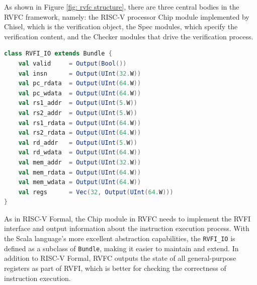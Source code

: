 \documentclass[conference]{IEEEtran}
\theoremstyle{definition}
\begin{document}
As shown in Figure \ref{fig: rvfc structure}, there are three central bodies in the RVFC framework, namely: the RISC-V processor Chip module implemented by Chisel, which is the verification object, the Spec modules, which specify the verification content, and the Checker modules that drive the verification process.

\begin{lstlisting}[language=scala, caption={RVFI Definition in RVFC}, label=rvfic]
class RVFI_IO extends Bundle {
    val valid     = Output(Bool())
    val insn      = Output(UInt(32.W))
    val pc_rdata  = Output(UInt(64.W))
    val pc_wdata  = Output(UInt(64.W))
    val rs1_addr  = Output(UInt(5.W))
    val rs2_addr  = Output(UInt(5.W))
    val rs1_rdata = Output(UInt(64.W))
    val rs2_rdata = Output(UInt(64.W))
    val rd_addr   = Output(UInt(5.W))
    val rd_wdata  = Output(UInt(64.W))
    val mem_addr  = Output(UInt(32.W))
    val mem_rdata = Output(UInt(64.W))
    val mem_wdata = Output(UInt(64.W))
    val regs      = Vec(32, Output(UInt(64.W)))
}
\end{lstlisting}

As in RISC-V Formal, the Chip module in RVFC needs to implement the RVFI interface and output information about the instruction execution process.
With the Scala language's more excellent abstraction capabilities, the \verb|RVFI_IO| is defined as a subclass of \verb|Bundle|, making it easier to maintain and extend.
In addition to RISC-V Formal, RVFC outputs the state of all general-purpose registers as part of RVFI, which is better for checking the correctness of instruction execution.
\end{document}
